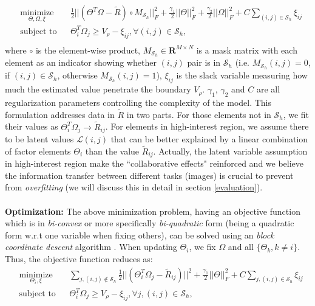 \documentclass{article} %
\begin{document}
\begin{equation}
\begin{aligned}
& \underset{\Theta,\Omega,\xi}{\text{minimize}}
& & \frac{1}{2}||(\Theta^T\Omega-\tilde{R}){\circ}M_{\mathcal{S}_h}||^2_F+\frac{\gamma_1}{2}||\Theta||_F^2+\frac{\gamma_2}{2}||\Omega||_F^2+C\sum_{(i,j)\in\mathcal{S}_h}\xi_{ij}\\
& \text{subject to}
& & \Theta_i^T\Omega_j{\geq}V_\rho-\xi_{ij}, \forall(i,j){\in}\mathcal{S}_h, \\
\end{aligned}
\label{hirlmf}
\end{equation}
where $\circ$ is the element-wise product, $M_{\mathcal{S}_h}{\in}\mathbf{R}^{M{\times}N}$ is a mask matrix with each element as an indicator showing whether $(i,j)$ pair is in $\mathcal{S}_h$ (i.e. $M_{\mathcal{S}_h}(i,j)=0$, if $(i,j){\in}\mathcal{S}_h$, otherwise $M_{\mathcal{S}_h}(i,j)=1$), $\xi_{ij}$ is the slack variable measuring how much the estimated value penetrate the boundary $V_\rho$. $\gamma_1$, $\gamma_2$ and $C$ are all regularization parameters controlling the complexity of the model. This formulation addresses data in $\tilde{R}$ in two parts. For those elements not in $\mathcal{S}_h$, we fit their values as $\Theta_i^T\Omega_j\rightarrow\tilde{R}_{ij}$. For elements in high-interest region, we assume there to be latent values $\mathcal{L}(i,j)$ that can be better explained by a linear combination of factor elements $\Theta_i$ than the value $\tilde{R}_{ij}$. Actually, the latent variable assumption in high-interest region make the ``collaborative effects" reinforced and we believe the information transfer between different tasks (images) is crucial to prevent from \emph{overfitting} (we will discuss this in detail in section \ref{evaluation}). \\\\
\textbf{Optimization:} The above minimization problem, having an objective function which is in \emph{bi-convex} or more specifically \emph{bi-quadratic} form (being a quadratic form w.r.t one variable when fixing others), can be solved using an \emph{block coordinate descent} algorithm \cite{al1983jointly}. When updating $\Theta_i$, we fix $\Omega$ and all $\{\Theta_k,k{\neq}i\}$. Thus, the objective function reduces as:
\begin{equation}
\begin{aligned}
& \underset{\Theta_i,\xi}{\text{minimize}}
& & \sum_{j,(i,j){\not\in}\mathcal{S}_h}\frac{1}{2}||(\Theta_i^T\Omega_j-\tilde{R}_{ij})||^2+\frac{\gamma_1}{2}||\Theta||_F^2+C\sum_{j,(i,j)\in\mathcal{S}_h}\xi_{ij}\\
& \text{subject to}
& & \Theta_i^T\Omega_j{\geq}V_\rho-\xi_{ij}, {\forall}j,(i,j){\in}\mathcal{S}_h, \\
\end{aligned}
\label{hirlmfsub}
\end{equation}
\end{document}
